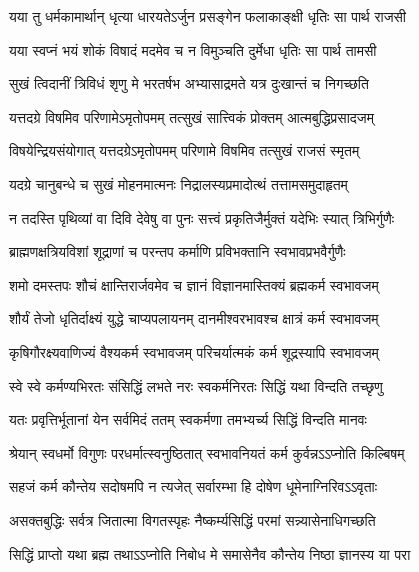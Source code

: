\twolineshloka
{यया तु धर्मकामार्थान् धृत्या धारयतेऽर्जुन}
{प्रसङ्गेन फलाकाङ्क्षी धृतिः सा पार्थ राजसी}%

\twolineshloka
{यया स्वप्नं भयं शोकं विषादं मदमेव च}
{न विमुञ्चति दुर्मेधा धृतिः सा पार्थ तामसी}%

\twolineshloka
{सुखं त्विदानीं त्रिविधं शृणु मे भरतर्षभ}
{अभ्यासाद्रमते यत्र दुःखान्तं च निगच्छति}%

\twolineshloka
{यत्तदग्रे विषमिव परिणामेऽमृतोपमम्}
{तत्सुखं सात्त्विकं प्रोक्तम् आत्मबुद्धिप्रसादजम्}%

\twolineshloka
{विषयेन्द्रियसंयोगात् यत्तदग्रेऽमृतोपमम्}
{परिणामे विषमिव तत्सुखं राजसं स्मृतम्}%

\twolineshloka
{यदग्रे चानुबन्धे च सुखं मोहनमात्मनः}
{निद्रालस्यप्रमादोत्थं तत्तामसमुदाहृतम्}%

\twolineshloka
{न तदस्ति पृथिव्यां वा दिवि देवेषु वा पुनः}
{सत्त्वं प्रकृतिजैर्मुक्तं यदेभिः स्यात् त्रिभिर्गुणैः}%

\twolineshloka
{ब्राह्मणक्षत्रियविशां शूद्राणां च परन्तप}
{कर्माणि प्रविभक्तानि स्वभावप्रभवैर्गुणैः}%

\twolineshloka
{शमो दमस्तपः शौचं क्षान्तिरार्जवमेव च}
{ज्ञानं विज्ञानमास्तिक्यं ब्रह्मकर्म स्वभावजम्}%

\twolineshloka
{शौर्यं तेजो धृतिर्दाक्ष्यं युद्धे चाप्यपलायनम्}
{दानमीश्वरभावश्च क्षात्रं कर्म स्वभावजम्}%

\twolineshloka
{कृषिगौरक्ष्यवाणिज्यं वैश्यकर्म स्वभावजम्}
{परिचर्यात्मकं कर्म शूद्रस्यापि स्वभावजम्}%

\twolineshloka
{स्वे स्वे कर्मण्यभिरतः संसिद्धिं लभते नरः}
{स्वकर्मनिरतः सिद्धिं यथा विन्दति तच्छृणु}%

\twolineshloka
{यतः प्रवृत्तिर्भूतानां येन सर्वमिदं ततम्}
{स्वकर्मणा तमभ्यर्च्य सिद्धिं विन्दति मानवः}%

\twolineshloka
{श्रेयान् स्वधर्मो विगुणः परधर्मात्स्वनुष्ठितात्}
{स्वभावनियतं कर्म कुर्वन्नऽऽप्नोति किल्बिषम्}%

\twolineshloka
{सहजं कर्म कौन्तेय सदोषमपि न त्यजेत्}
{सर्वारम्भा हि दोषेण धूमेनाग्निरिवऽऽवृताः}%

\twolineshloka
{असक्तबुद्धिः सर्वत्र जितात्मा विगतस्पृहः}
{नैष्कर्म्यसिद्धिं परमां सन्न्यासेनाधिगच्छति}%

\twolineshloka
{सिद्धिं प्राप्तो यथा ब्रह्म तथाऽऽप्नोति निबोध मे}
{समासेनैव कौन्तेय निष्ठा ज्ञानस्य या परा}%

